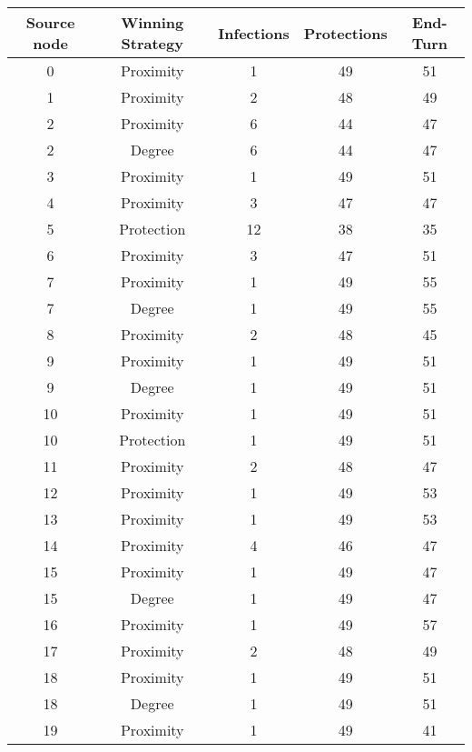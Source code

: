 \documentclass[results.tex]{subfiles}
\begin{document}
\begin{center}
  \begin{tabular}{| c || c | c | c | c |}
    \hline
    {\bfseries Source node} & {\bfseries Winning Strategy} & {\bfseries Infections} & {\bfseries Protections} & {\bfseries End-Turn} \\  %
    \hline\hline
    0 & Proximity & 1 & 49 & 51 \\ 
    \hline
    1 & Proximity & 2 & 48 & 49 \\ 
    \hline
    2 & Proximity & 6 & 44 & 47 \\ 
    \hline
    2 & Degree & 6 & 44 & 47 \\ 
    \hline
    3 & Proximity & 1 & 49 & 51 \\ 
    \hline
    4 & Proximity & 3 & 47 & 47 \\ 
    \hline
    5 & Protection & 12 & 38 & 35 \\ 
    \hline
    6 & Proximity & 3 & 47 & 51 \\ 
    \hline
    7 & Proximity & 1 & 49 & 55 \\ 
    \hline
    7 & Degree & 1 & 49 & 55 \\ 
    \hline
    8 & Proximity & 2 & 48 & 45 \\ 
    \hline
    9 & Proximity & 1 & 49 & 51 \\ 
    \hline
    9 & Degree & 1 & 49 & 51 \\ 
    \hline
    10 & Proximity & 1 & 49 & 51 \\ 
    \hline
    10 & Protection & 1 & 49 & 51 \\ 
    \hline
    11 & Proximity & 2 & 48 & 47 \\ 
    \hline
    12 & Proximity & 1 & 49 & 53 \\ 
    \hline
    13 & Proximity & 1 & 49 & 53 \\ 
    \hline
    14 & Proximity & 4 & 46 & 47 \\ 
    \hline
    15 & Proximity & 1 & 49 & 47 \\ 
    \hline
    15 & Degree & 1 & 49 & 47 \\ 
    \hline
    16 & Proximity & 1 & 49 & 57 \\ 
    \hline
    17 & Proximity & 2 & 48 & 49 \\ 
    \hline
    18 & Proximity & 1 & 49 & 51 \\ 
    \hline
    18 & Degree & 1 & 49 & 51 \\ 
    \hline
    19 & Proximity & 1 & 49 & 41 \\ 

\end{tabular}
\end{center}
\end{document}
